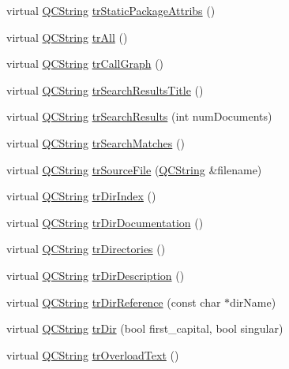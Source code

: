 \begin{DoxyCompactItemize}
virtual \mbox{\hyperlink{class_q_c_string}{Q\+C\+String}} \mbox{\hyperlink{class_translator_slovene_ab17a1659a2abd967872fa7a78aaf1dbf}{tr\+Static\+Package\+Attribs}} ()
\item 
virtual \mbox{\hyperlink{class_q_c_string}{Q\+C\+String}} \mbox{\hyperlink{class_translator_slovene_a03a83cef286998d2ac169efe64ea200b}{tr\+All}} ()
\item 
virtual \mbox{\hyperlink{class_q_c_string}{Q\+C\+String}} \mbox{\hyperlink{class_translator_slovene_a2ac7bc314de13a71dca04b10af9ebc75}{tr\+Call\+Graph}} ()
\item 
virtual \mbox{\hyperlink{class_q_c_string}{Q\+C\+String}} \mbox{\hyperlink{class_translator_slovene_ab83baf757fa3ee37089758b657191a2f}{tr\+Search\+Results\+Title}} ()
\item 
virtual \mbox{\hyperlink{class_q_c_string}{Q\+C\+String}} \mbox{\hyperlink{class_translator_slovene_a337000022455759ea3cdbee809497f44}{tr\+Search\+Results}} (int num\+Documents)
\item 
virtual \mbox{\hyperlink{class_q_c_string}{Q\+C\+String}} \mbox{\hyperlink{class_translator_slovene_a0446ae7058a03da42c15650f5948aea1}{tr\+Search\+Matches}} ()
\item 
virtual \mbox{\hyperlink{class_q_c_string}{Q\+C\+String}} \mbox{\hyperlink{class_translator_slovene_a5bb51484f92d4ebdfe1d1f5a60ad3337}{tr\+Source\+File}} (\mbox{\hyperlink{class_q_c_string}{Q\+C\+String}} \&filename)
\item 
virtual \mbox{\hyperlink{class_q_c_string}{Q\+C\+String}} \mbox{\hyperlink{class_translator_slovene_a918bd99647fd753504f052d39b004e79}{tr\+Dir\+Index}} ()
\item 
virtual \mbox{\hyperlink{class_q_c_string}{Q\+C\+String}} \mbox{\hyperlink{class_translator_slovene_a0a7b1a2c7f83f2c655fe28e3ddda8bf9}{tr\+Dir\+Documentation}} ()
\item 
virtual \mbox{\hyperlink{class_q_c_string}{Q\+C\+String}} \mbox{\hyperlink{class_translator_slovene_a7d975ec6d1c31123233ffbe5d6c7d846}{tr\+Directories}} ()
\item 
virtual \mbox{\hyperlink{class_q_c_string}{Q\+C\+String}} \mbox{\hyperlink{class_translator_slovene_ae3ac658a4e9073148fe3a021b1ca67e1}{tr\+Dir\+Description}} ()
\item 
virtual \mbox{\hyperlink{class_q_c_string}{Q\+C\+String}} \mbox{\hyperlink{class_translator_slovene_ad4fb72cba367a1abc0526ef9a6b057f6}{tr\+Dir\+Reference}} (const char $\ast$dir\+Name)
\item 
virtual \mbox{\hyperlink{class_q_c_string}{Q\+C\+String}} \mbox{\hyperlink{class_translator_slovene_a44f4fa649bd9b625c3f222b04f95d82a}{tr\+Dir}} (bool first\+\_\+capital, bool singular)
\item 
virtual \mbox{\hyperlink{class_q_c_string}{Q\+C\+String}} \mbox{\hyperlink{class_translator_slovene_ad89cf9e19c328cff11a3b253adf6e751}{tr\+Overload\+Text}} ()
\end{DoxyCompactItemize}

